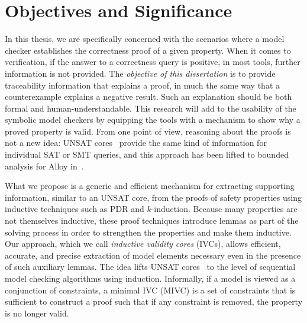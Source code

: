 
\section{Objectives and Significance}
\label{sec:obj}
In this thesis, we are specifically concerned with the scenarios where a model checker establishes the correctness proof of a given property.
 When it comes to verification, if the answer to a correctness query is positive, in most tools,
further information is not provided.  The \textit{objective of this dissertation} is to provide traceability information that explains a proof, in much the same way that a counterexample explains a negative result.
Such an explanation should be both formal and human-understandable. This research will add to the usability of the symbolic model checkers by equipping the tools with a mechanism to show why a proved property is valid. From one point of view, reasoning about the proofs is not a new idea: UNSAT cores~\cite{zhang2003extracting}
provide the same kind of information for individual SAT or
SMT queries, and this approach has been lifted to bounded analysis
for Alloy in~\cite{Torlak08:cores}.

What we propose is a generic and efficient
mechanism for extracting supporting information, similar to an UNSAT
core, from the proofs of safety properties using inductive techniques
such as PDR and $k$-induction. Because many
properties are not themselves inductive, these proof techniques
introduce lemmas as part of the solving process in order to strengthen
the properties and make them inductive. Our approach, which we call {\em inductive validity cores} (IVCs), allows efficient, accurate, and precise extraction of model elements necessary even in the presence of such auxiliary lemmas. The idea lifts UNSAT cores~\cite{zhang2003extracting}
to the level of sequential model checking algorithms using induction.  Informally, if a model is viewed as a conjunction of constraints,
a minimal IVC (MIVC) is a set of constraints that is sufficient to construct a proof such that if any constraint is removed, the property is no longer valid.


